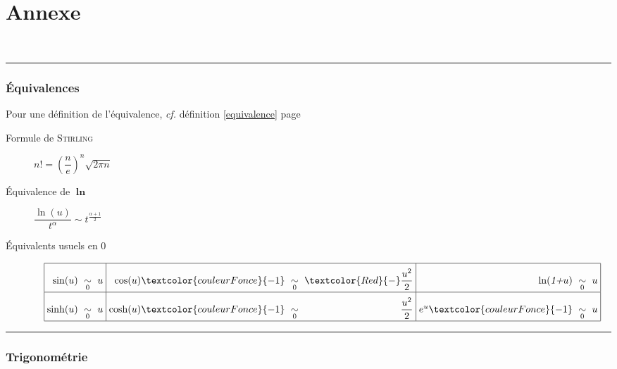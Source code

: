 \documentclass[11pt,a4paper,fleqn,pdftex]{report}
\begin{document}
\part{Annexe}
\hfill \\
\rule{\columnwidth}{0.5pt}
\section{Équivalences}
Pour une définition de l'équivalence, \textit{cf.} définition \ref{equivalence} page \pageref{equivalence}
\begin{description}
\item[Formule de \textsc{Stirling}] $\boxed{n!=\left(\dfrac{n}{e}\right)^{n}\sqrt{2\pi n}}$
\item[Équivalence de $\boldsymbol{\ln}$] $\dfrac{\ln(u)}{t^{\alpha}}\sim t^{\frac{\alpha+1}{2}}$
\item[Équivalents usuels en 0] \[
\arraycolsep=3pt\def\arraystretch{2.4}
\begin{array}{|r c l|r c r|r c l|}
\hline
\sin(u)& \underset{0}{\sim}& u & \cos(u)\textcolor{couleurFonce}{-1} &\underset{0}{\sim} & \textcolor{Red}{-} \dfrac{u^2}{2} & \ln(\emph{1+}u) &\underset{0}{\sim}& u \\
\hline
\sinh(u) &\underset{0}{\sim} &u & \cosh(u)\textcolor{couleurFonce}{-1} &\underset{0}{\sim} &\dfrac{u^2}{2} & e^u \textcolor{couleurFonce}{-1} &\underset{0}{\sim} & u \\
\hline
\end{array}
\]
\end{description}


\rule{\columnwidth}{0.5pt}
\section{Trigonométrie}
\end{document}
